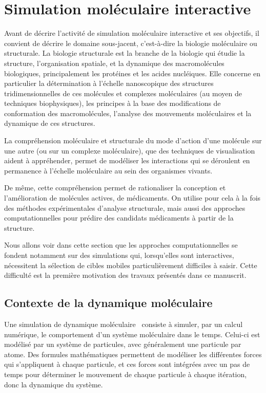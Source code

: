 	\section{Simulation moléculaire interactive}
	Avant de décrire l'activité de simulation moléculaire interactive et ses objectifs, il convient de décrire le domaine sous-jacent, c'est-à-dire la biologie moléculaire ou structurale. 
	La biologie structurale est la branche de la biologie qui étudie la structure, l'organisation spatiale, et la dynamique des macromolécules biologiques, principalement les protéines et les acides nucléiques. Elle concerne en particulier la détermination à l'échelle nanoscopique des structures tridimensionnelles de ces molécules et complexes moléculaires (au moyen de techniques biophysiques), les principes à la base des modifications de conformation des macromolécules, l'analyse des mouvements moléculaires et la dynamique de ces structures.

La compréhension moléculaire et structurale du mode d'action d'une molécule sur une autre (ou sur un complexe moléculaire), que des techniques de visualisation aident à appréhender, permet de modéliser les interactions qui se déroulent en permanence à l'échelle moléculaire au sein des organismes vivants.

De même, cette compréhension permet de rationaliser la conception et l'amélioration de molécules actives, de médicaments. On utilise pour cela à la fois des méthodes expérimentales d'analyse structurale, mais aussi des approches computationnelles pour prédire des candidats médicaments à partir de la structure.

Nous allons voir dans cette section que les approches computationnelles se fondent notamment sur des simulations qui, lorsqu'elles sont interactives, nécessitent la sélection de cibles mobiles particulièrement difficiles à saisir. Cette difficulté est la première motivation des travaux présentés dans ce manuscrit.
	
	\FloatBarrier \subsection{Contexte de la dynamique moléculaire}
	Une simulation de dynamique moléculaire~\cite{fermi1955alamos, alder1959studies, rahman1964correlations, gibson1960dynamics, lennard1924determination} consiste à simuler, par un calcul numérique, le comportement d'un système moléculaire dans le temps. Celui-ci est modélisé par un système de particules, avec généralement une particule par atome. Des formules mathématiques permettent de modéliser les différentes forces qui s'appliquent à chaque particule, et ces forces sont intégrées avec un pas de temps pour déterminer le mouvement de chaque particule à chaque itération, donc la dynamique du système.
	
